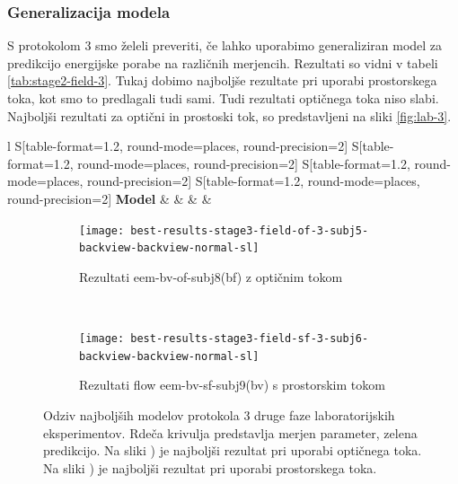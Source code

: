 \subsubsection{Generalizacija modela}
S protokolom 3 smo želeli preveriti, če lahko uporabimo generaliziran model za predikcijo energijske porabe na različnih merjencih. Rezultati so vidni v tabeli \ref{tab:stage2-field-3}. Tukaj dobimo najboljše rezultate pri uporabi prostorskega toka, kot smo to predlagali tudi sami. Tudi rezultati optičnega toka niso slabi. Najboljši rezultati za optični in prostoski tok, so predstavljeni na sliki \ref{fig:lab-3}.

\begin{table}[!htbp]
	\centering
	\begin{tabular}{l S[table-format=1.2, round-mode=places, round-precision=2] S[table-format=1.2, round-mode=places, round-precision=2] S[table-format=1.2, round-mode=places, round-precision=2] S[table-format=1.2, round-mode=places, round-precision=2]}
		\toprule
		\textbf{Model} &  &  &  &  \\
		\midrule
		\bottomrule
	\end{tabular}
	\caption{Validacijske metrike za protokol 3 druge faze terenskih eksperimentov.}
	\label{tab:stage2-field-3}
\end{table}

\begin{figure}[!htbp]
	\centering
	\begin{subfigure}[t]{0.45\columnwidth}
		\texttt{[image: best-results-stage3-field-of-3-subj5-backview-backview-normal-sl]}
		\caption{Rezultati eem-bv-of-subj8(bf) z optičnim tokom}
		\label{fig:field-of-3}
	\end{subfigure}
	~
	\begin{subfigure}[t]{0.45\columnwidth}
		\texttt{[image: best-results-stage3-field-sf-3-subj6-backview-backview-normal-sl]}
		\caption{Rezultati flow eem-bv-sf-subj9(bv) s prostorskim tokom}
		\label{fig:field-sf-3}
	\end{subfigure}
	\caption[Odziv najboljših modelov protokola 3 druge faze laboratorijskih eksperimentov]{Odziv najboljših modelov protokola 3 druge faze laboratorijskih eksperimentov. Rdeča krivulja predstavlja merjen parameter, zelena predikcijo. Na sliki ) je najboljši rezultat pri uporabi optičnega toka. Na sliki ) je najboljši rezultat pri uporabi prostorskega toka.}
	\label{fig:field-3}
\end{figure}











